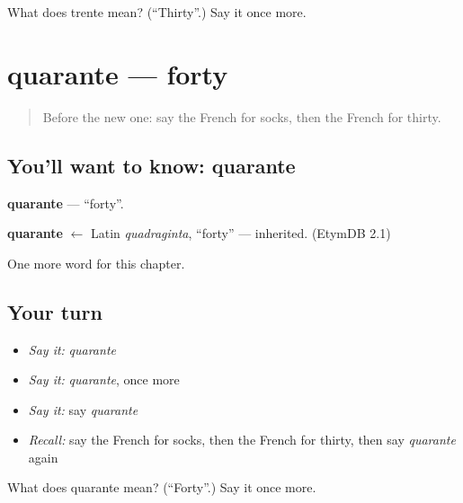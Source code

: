 \begin{tcolorbox}[breakable,colback=teal!4,colframe=teal!35!black,title={Before you move on}]
What does trente mean? (\textquotedblleft{}Thirty\textquotedblright{}.) Say it once more.
\end{tcolorbox}
\section[quarante]{quarante — forty}

\label{lesson:FR-C105-quarante}



\begin{quote}
Before the new one: say the French for socks, then the French for thirty.
\end{quote}

\subsection*{You'll want to know: quarante}
\textbf{quarante} — \textquotedblleft{}forty\textquotedblright{}.

\begin{cousinweb}
\textbf{quarante} $\leftarrow$ Latin \emph{quadraginta}, \textquotedblleft{}forty\textquotedblright{} — inherited. (EtymDB 2.1)
\end{cousinweb}

\begin{grammarlens}[title={What you've built}]
One more word for this chapter.
\end{grammarlens}

\subsection*{Your turn}
\begin{itemize}
\raggedright
  \item \emph{Say it:} \emph{quarante}
  \item \emph{Say it:} \emph{quarante}, once more
  \item \emph{Say it:} say \emph{quarante}
  \item \emph{Recall:} say the French for socks, then the French for thirty, then say \emph{quarante} again
\end{itemize}

\begin{tcolorbox}[breakable,colback=teal!4,colframe=teal!35!black,title={Before you move on}]
What does quarante mean? (\textquotedblleft{}Forty\textquotedblright{}.) Say it once more.
\end{tcolorbox}
